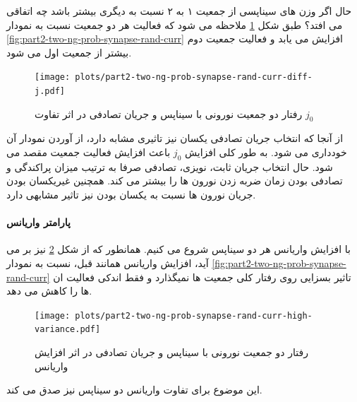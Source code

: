                 حال اگر وزن های سیناپسی از جمعیت ۱ به ۲ نسبت به دیگری بیشتر باشد چه اتفاقی می افتد؟ طبق شکل
                \ref{fig:part2-two-ng-prob-synapse-rand-curr-diff-j}
                ملاحظه می شود که فعالیت هر دو جمعیت نسبت به نمودار
                \ref{fig:part2-two-ng-prob-synapse-rand-curr} 
                افزایش می یابد و فعالیت جمعیت دوم بیشتر از جمعیت اول می شود.
                \begin{figure}[!ht]
                    \centering
                    \texttt{[image: plots/part2-two-ng-prob-synapse-rand-curr-diff-j.pdf]} 
                    \caption{رفتار دو جمعیت نورونی با سیناپس و جریان تصادفی در اثر تفاوت $j_0$}
                    \label{fig:part2-two-ng-prob-synapse-rand-curr-diff-j}
                \end{figure}

                از آنجا که انتخاب جریان تصادفی یکسان نیز تاثیری مشابه دارد، از آوردن نمودار آن خودداری می شود. به طور کلی افزایش 
                $j_0$ 
                باعث افزایش فعالیت جمعیت مقصد می شود. حال انتخاب جریان ثابت، نویزی، تصادفی صرفا به ترتیب میزان پراکندگی و تصادفی بودن زمان ضربه زدن نورون ها را بیشتر می کند. همچنین غیریکسان بودن جریان نورون ها نسبت به یکسان بودن نیز تاثیر مشابهی دارد.

                \paragraph*{پارامتر واریانس}
                    با افزایش واریانس هر دو سیناپس شروع می کنیم. همانطور که از شکل
                    \ref{fig:part2-two-ng-prob-synapse-rand-curr-high-variance}
                    نیز بر می آید، افزایش واریانس همانند قبل، نسبت به نمودار
                    \ref{fig:part2-two-ng-prob-synapse-rand-curr}
                    تاثیر بسزایی روی رفتار کلی جمعیت ها نمیگذارد و فقط اندکی فعالیت ان ها را کاهش می دهد.
                    \begin{figure}[!ht]
                        \centering
                        \texttt{[image: plots/part2-two-ng-prob-synapse-rand-curr-high-variance.pdf]} 
                        \caption{رفتار دو جمعیت نورونی با سیناپس و جریان تصادفی در اثر افزایش واریانس}
                        \label{fig:part2-two-ng-prob-synapse-rand-curr-high-variance}
                    \end{figure}
                    این موضوع برای تفاوت واریانس دو سیناپس نیز صدق می کند.

